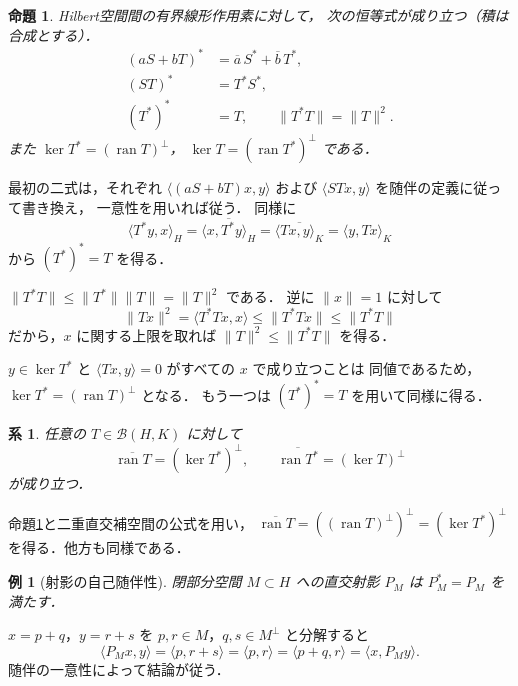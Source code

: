 \documentclass[a5paper,10pt,onecolumn]{jsarticle}
\makeatletter
\theoremstyle{mathnotetheorem}
\newtheorem{proposition}[theorem]{命題}
\newtheorem{corollary}[theorem]{系}
\newtheorem{example}[theorem]{例}
\renewcommand{\proofname}{証明}
\renewenvironment{proof}[1][\proofname]{%
  \par\pushQED{\qed}\normalfont\topsep4\p@\@plus2\p@\relax
  \trivlist\item[\hskip\labelsep\bfseries #1]\ignorespaces
}{\popQED\endtrivlist\@endpefalse}
\makeatother
\begin{document}
\begin{proposition}\label{prop:adjoint-rules}
Hilbert空間間の有界線形作用素に対して，
次の恒等式が成り立つ（積は合成とする）．
\begin{align*}
 (aS+bT)^*&=\overline a\,S^*+\overline b\,T^*,\\
 (ST)^*&=T^*S^*,\\
 (T^*)^*&=T,\qquad \|T^*T\|=\|T\|^2.
\end{align*}
また
$\ker T^*=(\operatorname{ran}T)^\perp$，
$\ker T=(\operatorname{ran}T^*)^\perp$ である．
\end{proposition}
\begin{proof}
最初の二式は，それぞれ
$\langle(aS+bT)x,y\rangle$ および
$\langle STx,y\rangle$ を随伴の定義に従って書き換え，
一意性を用いれば従う．
同様に
\[
 \langle T^*y,x\rangle_H
 =\overline{\langle x,T^*y\rangle_H}
 =\overline{\langle Tx,y\rangle_K}
 =\langle y,Tx\rangle_K
\]
から $(T^*)^*=T$ を得る．

$\|T^*T\|\le\|T^*\|\|T\|=\|T\|^2$ である．
逆に $\|x\|=1$ に対して
\[
 \|Tx\|^2=\langle T^*Tx,x\rangle
 \le\|T^*Tx\|\le\|T^*T\|
\]
だから，$x$ に関する上限を取れば
$\|T\|^2\le\|T^*T\|$ を得る．

$y\in\ker T^*$ と
$\langle Tx,y\rangle=0$ がすべての $x$ で成り立つことは
同値であるため，$\ker T^*=(\operatorname{ran}T)^\perp$ となる．
もう一つは $(T^*)^*=T$ を用いて同様に得る．
\end{proof}

\begin{corollary}
任意の $T\in\mathcal B(H,K)$ に対して
\[
 \overline{\operatorname{ran}T}
   =(\ker T^*)^\perp,\qquad
 \overline{\operatorname{ran}T^*}
   =(\ker T)^\perp
\]
が成り立つ．
\end{corollary}
\begin{proof}
命題\ref{prop:adjoint-rules}と二重直交補空間の公式を用い，
$\overline{\operatorname{ran}T}
=((\operatorname{ran}T)^\perp)^\perp
=(\ker T^*)^\perp$ を得る．他方も同様である．
\end{proof}

\begin{example}[射影の自己随伴性]
閉部分空間 $M\subset H$ への直交射影 $P_M$ は
$P_M^*=P_M$ を満たす．
\end{example}
\begin{proof}
$x=p+q$，$y=r+s$ を
$p,r\in M$，$q,s\in M^\perp$ と分解すると
\[
 \langle P_Mx,y\rangle
 =\langle p,r+s\rangle=\langle p,r\rangle
 =\langle p+q,r\rangle=\langle x,P_My\rangle.
\]
随伴の一意性によって結論が従う．
\end{proof}
\end{document}
